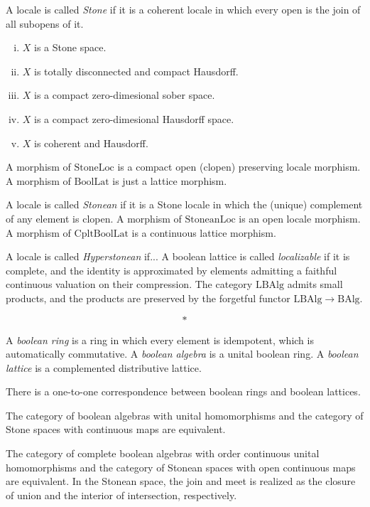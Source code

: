 \documentclass{../../large}
\begin{document}
A locale is called \emph{Stone} if it is a coherent locale in which every open is the join of all subopens of it.
\begin{enumerate}[(i)]
\item $X$ is a Stone space.
\item $X$ is totally disconnected and compact Hausdorff.
\item $X$ is a compact zero-dimesional sober space.
\item $X$ is a compact zero-dimesional Hausdorff space.
\item $X$ is coherent and Hausdorff.
\end{enumerate}
A morphism of $\mathrm{StoneLoc}$ is a compact open (clopen) preserving locale morphism.
A morphism of $\mathrm{BoolLat}$ is just a lattice morphism.





A locale is called \emph{Stonean} if it is a Stone locale in which the (unique) complement of any element is clopen.
A morphism of $\mathrm{StoneanLoc}$ is an open locale morphism.
A morphism of $\mathrm{CpltBoolLat}$ is a continuous lattice morphism.

A locale is called \emph{Hyperstonean} if...
A boolean lattice is called \emph{localizable} if it is complete, and the identity is approximated by elements admitting a faithful continuous valuation on their compression.
The category $\mathrm{LBAlg}$ admits small products, and the products are preserved by the forgetful functor $\mathrm{LBAlg}\to\mathrm{BAlg}$.



\[*\]

\begin{prb}
A \emph{boolean ring} is a ring in which every element is idempotent, which is automatically commutative.
A \emph{boolean algebra} is a unital boolean ring.
A \emph{boolean lattice} is a complemented distributive lattice.
\begin{parts}
\item There is a one-to-one correspondence between boolean rings and boolean lattices.
\item The category of boolean algebras with unital homomorphisms and the category of Stone spaces with continuous maps are equivalent.
\item The category of complete boolean algebras with order continuous unital homomorphisms and the category of Stonean spaces with open continuous maps are equivalent.
In the Stonean space, the join and meet is realized as the closure of union and the interior of intersection, respectively.
\end{parts}
\end{prb}
\end{document}

